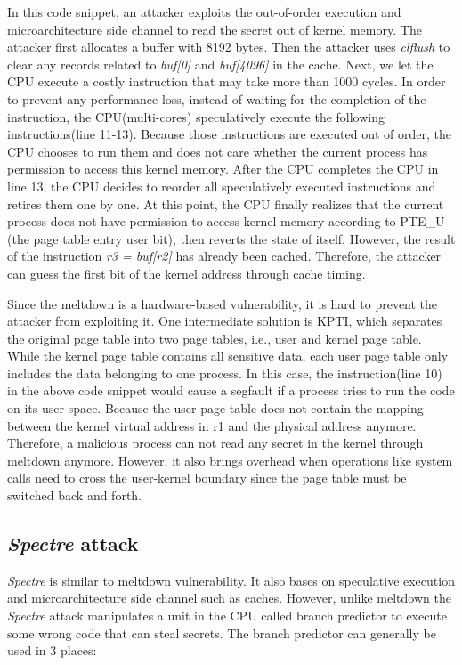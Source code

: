 In this code snippet, an attacker exploits the out-of-order execution and 
microarchitecture side channel to read the secret out of kernel memory. 
The attacker first allocates a buffer with 8192 bytes. Then the attacker uses 
\emph{clflush} to clear any records related to \emph{buf[0]} and \emph{buf[4096]} in the cache. 
Next, we let the CPU execute a costly instruction that may take more than 1000 cycles. 
In order to prevent any performance loss, instead of waiting for the completion of the instruction,  
the CPU(multi-cores) speculatively execute the following instructions(line 11-13). 
Because those instructions are executed out of order, the CPU chooses to run them and does 
not care whether the current process has permission to access this kernel memory. 
After the CPU completes the CPU in line 13, the CPU decides to reorder all speculatively 
executed instructions and retires them one by one. At this point, the CPU finally 
realizes that the current process does not have permission to access kernel memory 
according to PTE\_U (the page table entry user bit), then reverts the state of itself. 
However, the result of the instruction \emph{r3 = buf[r2]} has already been cached. Therefore, 
the attacker can guess the first bit of the kernel address through cache timing. 

Since the meltdown is a hardware-based vulnerability, it is hard to prevent the attacker 
from exploiting it. One intermediate solution is KPTI\cite{2}, which separates the original page 
table into two page tables, i.e., user and kernel page table.  While the kernel page table 
contains all sensitive data, each user page table only includes the data belonging to one process. 
In this case, the instruction(line 10) in the above code snippet would cause a segfault if 
a process tries to run the code on its user space. Because the user page table does not contain 
the mapping between the kernel virtual address in r1 and the physical address anymore. Therefore, 
a malicious process can not read any secret in the kernel through meltdown anymore. However, 
it also brings overhead when operations like system calls need to cross the user-kernel boundary 
since the page table must be switched back and forth.

\subsection{\emph{Spectre} attack}

\emph{Spectre} is similar to meltdown vulnerability. It also bases on speculative 
execution and microarchitecture side channel such as caches. However, unlike meltdown the 
\emph{Spectre} attack manipulates a unit in the CPU called branch predictor to execute some wrong 
code that can steal secrets.  The branch predictor can generally be used in 3 places:





